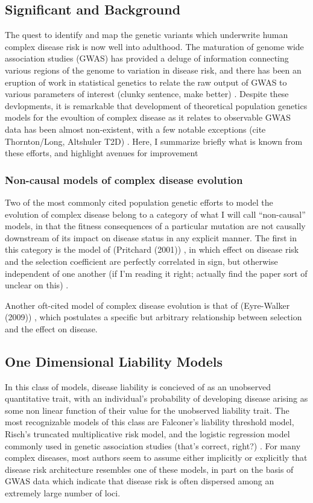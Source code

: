 \documentclass[a4paper,10pt]{article}
\newcommand{\jb}[1]{{\color{blue} (#1)} }
\begin{document}
\subsection{Significant and Background}

The quest to identify and map the genetic variants which underwrite human complex disease risk is now well into adulthood. The maturation of genome wide association studies (GWAS) has provided a deluge of information connecting various regions of the genome to variation in disease risk, and there has been an eruption of work in statistical genetics to relate the raw output of GWAS to various parameters of interest \jb{clunky sentence, make better}. Despite these devlopments, it is remarkable that development of theoretical population genetics models for the evoultion of complex disease as it relates to observable GWAS data has been almost non-existent, with a few notable exceptions \jb{cite Thornton/Long, Altshuler T2D}. Here, I summarize briefly what is known from these efforts, and highlight avenues for improvement

\subsubsection{Non-causal models of complex disease evolution}

Two of the most commonly cited population genetic efforts to model the evolution of complex disease belong to a category of what I will call ``non-causal'' models, in that the fitness consequences of a particular mutation are not causally downstream of its impact on disease status in any explicit manner. The first in this category is the model of \jb{Pritchard (2001)}, in which effect on disease risk and the selection coefficient are perfectly correlated in sign, but otherwise independent of one another \jb{if I'm reading it right; actually find the paper sort of unclear on this}.

Another oft-cited model of complex disease evolution is that of \jb{Eyre-Walker (2009)}, which postulates a specific but arbitrary relationship between selection and the effect on disease.


\subsection{One Dimensional Liability Models}
In this class of models, disease liability is concieved of as an unobserved quantitative trait, with an individual's probability of developing disease arising as some non linear function of their value for the unobserved liability trait. The most recognizable models of this class are Falconer's liability threshold model, Risch's truncated multiplicative risk model, and the logistic regression model commonly used in genetic association studies \jb{that's correct, right?}. For many complex diseases, most authors seem to assume either implicitly or explicitly that disease risk architecture resembles one of these models, in part on the basis of GWAS data which indicate that disease risk is often dispersed among an extremely large number of loci.
\end{document}
